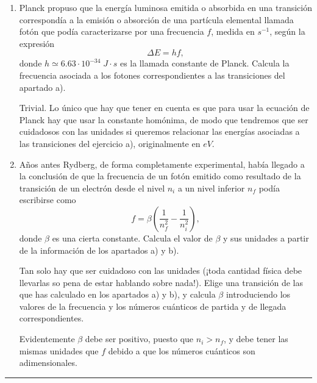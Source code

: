 \documentclass[a4paper,14pt]{extarticle}
\newcommand{\halmos}{
\vspace*{-3ex}

\begin{flushright}
\rule{1mm}{2.5mm} \end{flushright}
}
\renewcommand{\qed}{\halmos}
\begin{document}
\begin{enumerate}
\begin{enumerate}[label=\alph*)]
    	 Calcula las cuatro energías, en $eV$, que puede emitir un electrón cuando \textit{cae} al nivel fundamental $n=1$ procedente de las órbitas correspondientes a $n=2$, $n=3$, $n=4$ y $n=5$.
    	 \begin{mdframed}[backgroundcolor=brown!10]  
    	 Las cuatro transiciones llevan aparejadas una energía dada por la diferencia, en valor absoluto, entre las energías de cada nivel según el modelo de Bohr. El cálculo, en $eV$, es trivial.
    	 \end{mdframed}
    		\item Planck propuso que la energía luminosa emitida o absorbida en una transición correspondía a la emisión o absorción de una partícula elemental llamada fotón que podía caracterizarse por una frecuencia $f$, medida en $s^{-1}$, según la expresión 
    		$$\Delta E=hf,$$
    		donde $h\simeq 6.63\cdot 10^{-34}\;J\cdot s$ es la llamada constante de Planck. 
    		Calcula la frecuencia asociada a los fotones correspondientes a las transiciones del apartado a).
    		\begin{mdframed}[backgroundcolor=brown!10]  
    		Trivial. Lo único que hay que tener en cuenta es que para usar la ecuación de Planck hay que usar la constante homónima, de modo que tendremos que ser cuidadosos con las unidades si queremos relacionar las energías asociadas a las transiciones del ejercicio a), originalmente en $eV$. 
    		\end{mdframed}
    		\item Años antes Rydberg, de forma completamente experimental, había llegado a la conclusión de que la frecuencia de un fotón emitido como resultado de la transición de un electrón desde el nivel $n_i$ a un nivel inferior $n_f$ podía escribirse como 
    		$$f=\beta\left(\frac{1}{n_f^2}-\frac{1}{n_i^2}\right),$$
    		donde $\beta$ es una cierta constante. Calcula el valor de $\beta$ y sus unidades a partir de la información de los apartados a) y b).
    		\begin{mdframed}[backgroundcolor=brown!10]  
    		Tan solo hay que ser cuidadoso con las unidades (¡toda cantidad física debe llevarlas so pena de estar hablando sobre nada!). Elige una transición de las que has calculado en los apartados a) y b), y calcula $\beta$ introduciendo los valores de la frecuencia y los números cuánticos de partida y de llegada correspondientes. 
    		
    		Evidentemente $\beta$ debe ser positivo, puesto que $n_i>n_f$, y debe tener las mismas unidades que $f$ debido a que los números cuánticos son adimensionales.
    		\end{mdframed}
    	\end{enumerate}
		\qed    	

\end{enumerate}
\end{document}
